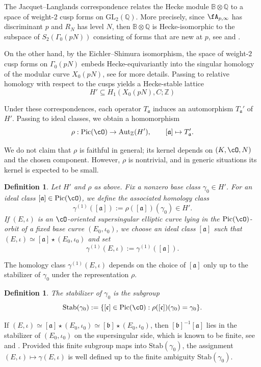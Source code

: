 \documentclass[10pt]{amsart}
\theoremstyle{theostyle}
\newtheorem{definition}[theorem]{Definition}
\newcommand{\QQ}{\mathbb{Q}} \newcommand{\RR}{\mathbb{R}}
\newcommand{\ZZ}{\mathbb{Z}}
\newcommand{\GL}{\mathrm{GL}} \newcommand{\SL}{\mathrm{SL}}
\renewcommand{\fa}{\mathfrak{a}} \newcommand{\fb}{\mathfrak{b}} \newcommand{\fc}{\mathfrak{c}}
\newcommand{\Aut}{\mathrm{Aut}}
\newcommand{\Pic}{\mathrm{Pic}}
\newcommand{\Stab}{\mathrm{Stab}}
\begin{document}
The Jacquet--Langlands correspondence relates the Hecke module
$\mathbb B\otimes\QQ$ to a space of weight-$2$ cusp forms on $\GL_2(\QQ)$.  More
precisely, since $\fA_{p,\infty}$ has discriminant $p$ and $R_N$ has level $N$, then
$\mathbb B\otimes\QQ$ is Hecke-isomorphic to the subspace of
$S_2(\Gamma_0(pN))$ consisting of forms that are new at $p$, see \cite[\S 4/5]{Martin:Basis} and \cite{DV:Hilbert}.  

On the other hand, by the Eichler--Shimura isomorphism, the space of weight-$2$ cusp
forms on $\Gamma_0(pN)$ embeds Hecke-equivariantly into the singular homology
of the modular curve $X_0(pN)$, see \cite{Darmon:RatPts} for more details.  Passing to relative homology with respect to the
cusps yields a Hecke-stable lattice
\[
H' \subseteq H_1(X_0(pN),C;\ZZ)
\]

Under these correspondences, each operator $T_\fa$ induces an automorphism
$T_\fa'$ of $H'$. Passing to ideal classes, we obtain a homomorphism
\[
\rho: \Pic(\cO) \to \Aut_\ZZ(H'),
\qquad [\fa] \mapsto T_\fa'.
\]

We do not claim that $\rho$ is faithful in general; its kernel depends on
$(K,\cO,N)$ and the chosen component. However, $\rho$ is nontrivial, and in
generic situations its kernel is expected to be small.

\begin{definition}
	Let $H'$ and $\rho$ as above. Fix a nonzero base class $\gamma_0\in H'$. For an ideal class $[\fa]\in\Pic(\cO)$, we define the associated homology
	class
	\[
	\gamma^{(1)}([\fa]) := \rho([\fa])(\gamma_0) \in H'.
	\]
	If $(E,\iota)$ is an $\cO$-oriented supersingular elliptic curve lying in the
	$\Pic(\cO)$-orbit of a fixed base curve $(E_0,\iota_0)$, we choose an ideal
	class $[\fa]$ such that $(E,\iota)\simeq [\fa]\star(E_0,\iota_0)$ and set
	\[
	\gamma^{(1)}(E,\iota) := \gamma^{(1)}([\fa]).
	\]
\end{definition}

The homology class $\gamma^{(1)}(E,\iota)$ depends on the choice of $[\fa]$ only up
to the stabilizer of $\gamma_0$ under the representation $\rho$.

\begin{definition}
	The stabilizer of $\gamma_0$ is the subgroup
	\[
	\Stab(\gamma_0)
	:= \{[\fc]\in\Pic(\cO) : \rho([\fc])(\gamma_0)=\gamma_0\}.
	\]
\end{definition}

If $(E,\iota)\simeq[\fa]\star(E_0,\iota_0)\simeq[\fb]\star(E_0,\iota_0)$, then
$[\fb]^{-1}[\fa]$ lies in the stabilizer of $(E_0,\iota_0)$ on the
supersingular side, which is known to be finite, see \cite{Deuring} and \cite[\S~5.2]{Kohel1996}.  Provided this finite subgroup maps into $\Stab(\gamma_0)$, the
assignment $(E,\iota)\mapsto\gamma(E,\iota)$ is well defined up to the finite
ambiguity $\Stab(\gamma_0)$.
\end{document}
